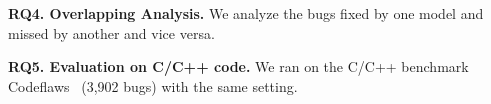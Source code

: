 




\vspace{2pt} {\bf RQ4. Overlapping Analysis.} We analyze the bugs
fixed by one model and missed by another and vice versa.

{\bf RQ5. Evaluation on C/C++ code.} We ran {\tool} on the C/C++ benchmark
Codeflaws~\cite{tan2017codeflaws} (3,902 bugs) with the same
setting.
